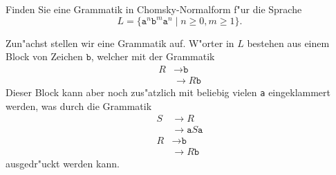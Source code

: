 Finden Sie eine Grammatik in Chomsky-Normalform f"ur die Sprache
\[
L=\{
\texttt{a}^n\texttt{b}^m\texttt{a}^n
\;|\;
n\ge 0, m\ge 1
\}.
\]

\begin{loesung}
Zun"achst stellen wir eine Grammatik auf.
W"orter in $L$ bestehen aus einem Block von Zeichen $\texttt{b}$,
welcher mit der Grammatik
\begin{align*}
R&\rightarrow \texttt{b} \\
 &\rightarrow R\texttt{b}
\end{align*}
Dieser Block kann aber noch zus"atzlich mit beliebig vielen 
\texttt{a} eingeklammert werden, was durch die Grammatik
\begin{align*}
S&\rightarrow R \\
 &\rightarrow \texttt{a} S \texttt{a}\\
R&\rightarrow \texttt{b} \\
 &\rightarrow R\texttt{b}
\end{align*}
ausgedr"uckt werden kann.


\end{loesung}
